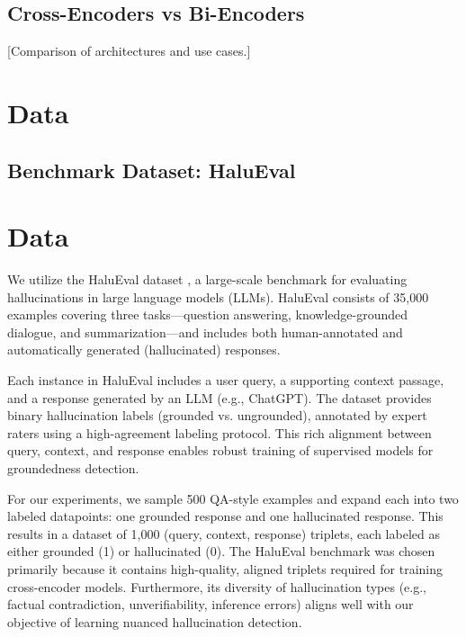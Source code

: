 \documentclass[11pt]{article}
\begin{document}
\subsection{Cross-Encoders vs Bi-Encoders}
[Comparison of architectures and use cases.]

\section{Data}
\subsection{Benchmark Dataset: HaluEval}
\section{Data}

We utilize the HaluEval dataset \cite{li2023halueval}, a large-scale benchmark for evaluating hallucinations in large language models (LLMs). HaluEval consists of 35,000 examples covering three tasks—question answering, knowledge-grounded dialogue, and summarization—and includes both human-annotated and automatically generated (hallucinated) responses.

Each instance in HaluEval includes a user query, a supporting context passage, and a response generated by an LLM (e.g., ChatGPT). The dataset provides binary hallucination labels (grounded vs. ungrounded), annotated by expert raters using a high-agreement labeling protocol. This rich alignment between query, context, and response enables robust training of supervised models for groundedness detection.

For our experiments, we sample 500 QA-style examples and expand each into two labeled datapoints: one grounded response and one hallucinated response. This results in a dataset of 1,000 (query, context, response) triplets, each labeled as either grounded (1) or hallucinated (0). The HaluEval benchmark was chosen primarily because it contains high-quality, aligned triplets required for training cross-encoder models. Furthermore, its diversity of hallucination types (e.g., factual contradiction, unverifiability, inference errors) aligns well with our objective of learning nuanced hallucination detection.
\end{document}
